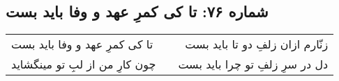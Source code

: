 \begin{center}
\section*{شماره ۷۶: تا کی کمرِ عهد و وفا باید بست}
\label{sec:076}
\begin{longtable}{l p{0.5cm} r}
تا کی کمرِ عهد و وفا باید بست
&&
زنّارم ازان زلفِ دو تا باید بست
\\
چون کارِ من از لبِ تو مینگشاید
&&
دل در سرِ زلفِ تو چرا باید بست
\\
\end{longtable}
\end{center}
